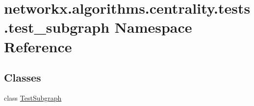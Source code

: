 \hypertarget{namespacenetworkx_1_1algorithms_1_1centrality_1_1tests_1_1test__subgraph}{}\section{networkx.\+algorithms.\+centrality.\+tests.\+test\+\_\+subgraph Namespace Reference}
\label{namespacenetworkx_1_1algorithms_1_1centrality_1_1tests_1_1test__subgraph}
\subsection*{Classes}
\begin{DoxyCompactItemize}
\item 
class \hyperlink{classnetworkx_1_1algorithms_1_1centrality_1_1tests_1_1test__subgraph_1_1TestSubgraph}{Test\+Subgraph}
\end{DoxyCompactItemize}
